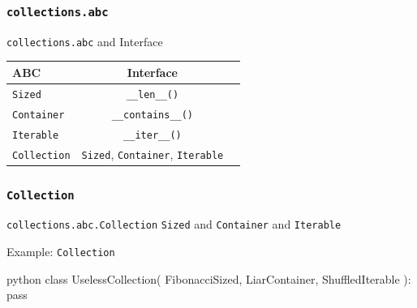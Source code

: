 \documentclass[aspectratio=169,dvipdfmx,12pt,notheorems]{beamer}
\theoremstyle{definition}
\begin{document}
\begin{frame}\frametitle{\texttt{collections.abc}}

\begin{exampleblock}{\texttt{collections.abc} and Interface}
\begin{table}[h]
\centering
\begin{tabular}{lcr}
\hline
ABC  & Interface \\
\hline
\texttt{Sized}  & \texttt{\_\_len\_\_()} \\
\texttt{Container}  & \texttt{\_\_contains\_\_()} \\
\texttt{Iterable}  &  \texttt{\_\_iter\_\_()} \\
\texttt{Collection}  & \texttt{Sized}, \texttt{Container}, \texttt{Iterable}  \\
\hline
\end{tabular}
\end{table}
\end{exampleblock}

\end{frame}

\begin{frame}[fragile]\frametitle{\texttt{Collection}}

\begin{block}{\texttt{collections.abc.Collection}}
\texttt{Sized} and \texttt{Container} and \texttt{Iterable}
\end{block}

\begin{exampleblock}{Example: \texttt{Collection}}
\begin{pygments}{python}
class UselessCollection(
    FibonacciSized, LiarContainer, ShuffledIterable
):
    pass
\end{pygments}
\end{exampleblock}

\end{frame}
\end{document}

